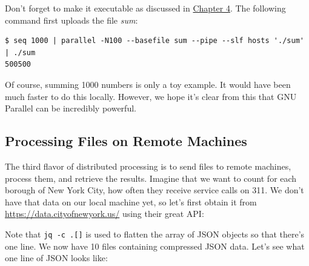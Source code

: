 \documentclass[
]{book}
\newenvironment{Shaded}{\begin{snugshade}}{\end{snugshade}}
\newcommand{\DataTypeTok}[1]{\textcolor[rgb]{0.13,0.29,0.53}{#1}}
\newcommand{\ExtensionTok}[1]{#1}
\newcommand{\FunctionTok}[1]{\textcolor[rgb]{0.00,0.00,0.00}{#1}}
\newcommand{\KeywordTok}[1]{\textcolor[rgb]{0.13,0.29,0.53}{\textbf{#1}}}
\newcommand{\NormalTok}[1]{#1}
\newcommand{\OperatorTok}[1]{\textcolor[rgb]{0.81,0.36,0.00}{\textbf{#1}}}
\newcommand{\StringTok}[1]{\textcolor[rgb]{0.31,0.60,0.02}{#1}}
\theoremstyle{definition}
\theoremstyle{definition}
\theoremstyle{definition}
\theoremstyle{remark}
\begin{document}
Don't forget to make it executable as discussed in \protect\hyperlink{chapter-4-creating-reusable-command-line-tools}{Chapter 4}. The following command first uploads the file \emph{sum}:

\begin{verbatim}
$ seq 1000 | parallel -N100 --basefile sum --pipe --slf hosts './sum' | ./sum
500500
\end{verbatim}

Of course, summing 1000 numbers is only a toy example. It would have been much faster to do this locally. However, we hope it's clear from this that GNU Parallel can be incredibly powerful.

\hypertarget{processing-files-on-remote-machines}{%
\subsection{Processing Files on Remote Machines}\label{processing-files-on-remote-machines}}

The third flavor of distributed processing is to send files to remote machines, process them, and retrieve the results. Imagine that we want to count for each borough of New York City, how often they receive service calls on 311. We don't have that data on our local machine yet, so let's first obtain it from \url{https://data.cityofnewyork.us/} using their great API:

\begin{Shaded}
\end{Shaded}

Note that \texttt{jq\ -c\ \textquotesingle{}.{[}{]}\textquotesingle{}} is used to flatten the array of JSON objects so that there's one line. We now have 10 files containing compressed JSON data. Let's see what one line of JSON looks like:
\end{document}
